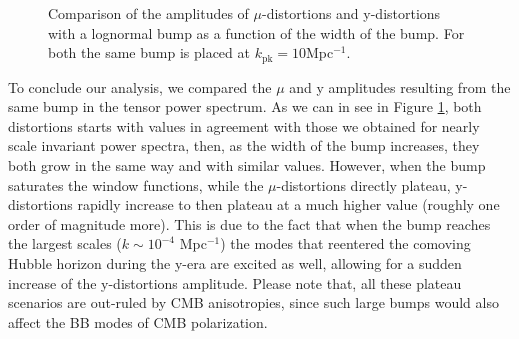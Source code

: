 \begin{figure}[!hb]
    \centering
{}
\caption{Comparison of the amplitudes of $\mu$-distortions  and y-distortions with a lognormal bump as a function of the width of the bump. For both the same bump is placed at $k_\text{pk}=10$Mpc$^{-1}$.}
\label{fig:muy_plateau}
\end{figure}

To conclude our analysis, we compared the $\mu$ and y amplitudes resulting from the same bump in the tensor power spectrum. As we can in see in Figure \ref{fig:muy_plateau}, both distortions starts with values in agreement with those we obtained for nearly scale invariant power spectra, then, as the width of the bump increases, they both grow in the same way and with similar values. However, when the bump saturates the window functions, while the $\mu$-distortions directly plateau, y-distortions rapidly increase to then plateau at a much higher value (roughly one order of magnitude more). This is due to the fact that when the bump reaches the largest scales ($k\sim10^{-4}$ Mpc$^{-1}$) the modes that reentered the comoving Hubble horizon during the y-era are excited as well, allowing for a sudden increase of the y-distortions amplitude. Please note that, all these plateau scenarios are out-ruled by CMB anisotropies, since such large bumps would also affect the BB modes of CMB polarization. 
